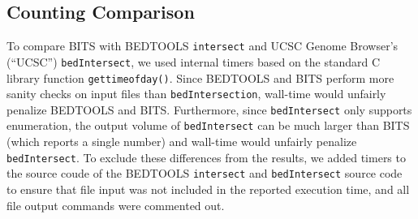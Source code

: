 \subsection{Counting Comparison}
To compare BITS with BEDTOOLS {\tt intersect} and UCSC Genome Browser’s
(``UCSC'') {\tt bedIntersect}, we used internal timers based on the standard C
library function {\tt gettimeofday()}.  Since BEDTOOLS and BITS perform more
sanity checks on input files than {\tt bedIntersection}, wall-time would
unfairly penalize BEDTOOLS and BITS.  Furthermore, since {\tt bedIntersect} only
supports enumeration, the output volume of {\tt bedIntersect} can be much larger
than BITS (which reports a single number) and wall-time would unfairly penalize
{\tt bedIntersect}.  To exclude these differences from the results, we added
timers to the source coude of the BEDTOOLS {\tt intersect} and 
{\tt bedIntersect} source code to ensure that file input was not included in the
reported execution time, and all file output commands were commented out.
